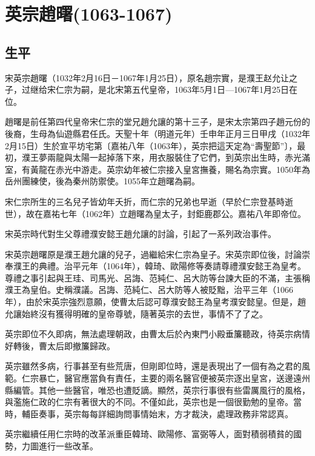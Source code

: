 
\section{英宗趙曙\tiny(1063-1067)}

\subsection{生平}

宋英宗趙曙（1032年2月16日－1067年1月25日），原名趙宗實，是濮王赵允让之子，过继给宋仁宗为嗣，是北宋第五代皇帝，1063年5月1日—1067年1月25日在位。

趙曙是前任第四代皇帝宋仁宗的堂兄趙允讓的第十三子，是宋太宗第四子趙元份的後裔，生母為仙遊縣君任氏。天聖十年（明道元年）壬申年正月三日甲戌（1032年2月15日）生於宣平坊宅第〔嘉祐八年（1063年），英宗把這天定為“壽聖節”〕，最初，濮王夢兩龍與太陽一起掉落下來，用衣服裝住了它們，到英宗出生時，赤光滿室，有黃龍在赤光中游走。英宗幼年被仁宗接入皇宮撫養，賜名為宗實。1050年為岳州團練使，後為秦州防禦使。1055年立趙曙為嗣。

宋仁宗所生的三名兒子皆幼年夭折，而仁宗的兄弟也早逝（早於仁宗登基時逝世），故在嘉祐七年（1062年）立趙曙為皇太子，封鉅鹿郡公。嘉祐八年即帝位。

宋英宗時代對生父尊禮濮安懿王趙允讓的討論，引起了一系列政治事件。

宋英宗趙曙原是濮王趙允讓的兒子，過繼給宋仁宗為皇子。宋英宗即位後，討論崇奉濮王的典禮。治平元年（1064年），韓琦、歐陽修等奏請尊禮濮安懿王為皇考。尊禮之事引起與王珪、司馬光、呂誨、范純仁、呂大防等台諫大臣的不滿，主張稱濮王為皇伯。史稱濮議。呂誨、范純仁、呂大防等人被貶黜，治平三年（1066年），由於宋英宗強烈意願，使曹太后認可尊濮安懿王為皇考濮安懿皇。但是，趙允讓始終沒有獲得明確的皇帝尊號，隨著英宗的去世，事情不了了之。

英宗即位不久即病，無法處理朝政，由曹太后於內東門小殿垂簾聽政，待英宗病情好轉後，曹太后即撤簾歸政。

英宗雖然多病，行事甚至有些荒唐，但剛即位時，還是表現出了一個有為之君的風範。仁宗暴亡，醫官應當負有責任，主要的兩名醫官便被英宗逐出皇宮，送邊遠州縣編管。其他一些醫官，唯恐也遭貶謫。顯然，英宗行事很有些雷厲風行的風格，與濫施仁政的仁宗有著很大的不同。不僅如此，英宗也是一個很勤勉的皇帝。當時，輔臣奏事，英宗每每詳細詢問事情始末，方才裁決，處理政務非常認真。

英宗繼續任用仁宗時的改革派重臣韓琦、歐陽修、富弼等人，面對積弱積貧的國勢，力圖進行一些改革。

